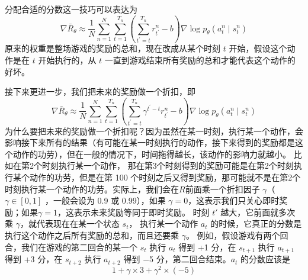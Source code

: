 分配合适的分数这一技巧可以表达为
\begin{equation}
    \label{eq:}
    \nabla \bar{R}_{\theta} \approx \frac{1}{N} \sum_{n=1}^{N} \sum_{t=1}^{T_{n}}\left(\sum_{t^{\prime}=t}^{T_{n}} r_{t^{\prime}}^{n}-b\right) \nabla \log p_{\theta}\left(a_{t}^{n} \mid s_{t}^{n}\right)
\end{equation}
原来的权重是整场游戏的奖励的总和，现在改成从某个时刻 $t$ 开始，假设这个动作是在 $t$ 开始执行的，从 $t$ 一直到游戏结束所有奖励的总和才能代表这个动作的好坏。 



接下来更进一步，我们把未来的奖励做一个折扣，即
\begin{equation}
    \label{eq:}
    \nabla \bar{R}_{\theta} \approx \frac{1}{N} \sum_{n=1}^{N} \sum_{t=1}^{T_{n}}\left(\sum_{t^{\prime}=t}^{T_{n}} \gamma^{t^{\prime}-t} r_{t^{\prime}}^{n}-b\right) \nabla \log p_{\theta}\left(a_{t}^{n} \mid s_{t}^{n}\right)
\end{equation}
为什么要把未来的奖励做一个折扣呢？因为虽然在某一时刻，执行某一个动作，会影响接下来所有的结果（有可能在某一时刻执行的动作，接下来得到的奖励都是这个动作的功劳），但在一般的情况下，时间拖得越长，该动作的影响力就越小。 比如在第2个时刻执行某一个动作， 那在第3个时刻得到的奖励可能是在第2个时刻执行某个动作的功劳，但是在第 100 个时刻之后又得到奖励，那可能就不是在第2个时刻执行某一个动作的功劳。实际上，我们会在$R$前面乘一个折扣因子 $\gamma$（$\gamma \in [0,1] $ ，一般会设为 0.9 或 0.99），如果 $\gamma = 0$，这表示我们只关心即时奖励；如果$\gamma = 1$，这表示未来奖励等同于即时奖励。
时刻 $t'$ 越大，它前面就多次乘 $\gamma$，就代表现在在某一个状态 $s_t$， 执行某一个动作 $a_t$ 的时候，它真正的分数是执行这个动作之后所有奖励的总和，而且还要乘 $\gamma$。
例如，假设游戏有两个回合，我们在游戏的第二回合的某一个 $s_t$ 执行 $a_t$ 得到 +1 分，在 $s_{t+1}$ 执行 $a_{t+1}$ 得到 +3 分，在 $s_{t+2}$ 执行 $a_{t+2}$ 得到 $-$5 分，第二回合结束。$a_t$ 的分数应该是
$$
1+ \gamma \times 3+\gamma^2 \times(-5)
$$


